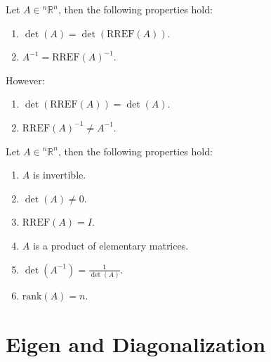 \documentclass[11pt]{report}
\begin{document}
\begin{theorem}
    Let $A \in  {^n\mathbb{R}^n}$, then the following properties hold:
    \begin{enumerate}
        \item $\det(A) = \det(\text{RREF}(A))$.
        \item $A^{-1} = \text{RREF}(A)^{-1}$.
    \end{enumerate}
    However:
    \begin{enumerate}
        \item $\det(\text{RREF}(A)) = \det(A)$.
        \item $\text{RREF}(A)^{-1} \neq A^{-1}$.
    \end{enumerate} 
    
\end{theorem}
\begin{theorem}
    Let $A \in  {^n\mathbb{R}^n}$, then the following properties hold:
    \begin{enumerate}
        \item $A$ is invertible.
        \item $\det(A) \neq 0$.
        \item $\text{RREF}(A) = I$.
        \item $A$ is a product of elementary matrices.
        \item $\det(A^{-1}) = \frac{1}{\det(A)}$.
        \item $\text{rank}(A) = n$.
    \end{enumerate}
\end{theorem}
\section{Eigen and Diagonalization}
\end{document}
